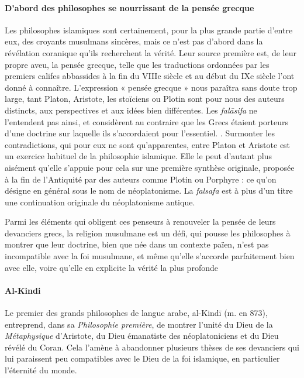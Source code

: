 \paragraph{D'abord des philosophes se nourrissant de la pensée grecque}Les philosophes islamiques sont certainement, pour la plus grande partie
d'entre eux, des croyants musulmans sincères, mais ce n'est pas d'abord
dans la révélation coranique qu'ils recherchent la vérité. Leur source
première est, de leur propre aveu, la pensée grecque, telle que les
traductions ordonnées par les premiers califes abbassides à la fin du
VIIIe siècle et au début du IXe siècle l'ont donné à connaître.
L'expression « pensée grecque » nous paraîtra
sans doute trop large, tant Platon, Aristote, les stoïciens ou Plotin
sont pour nous des auteurs distincts, aux perspectives et aux idées bien
différentes. Les \emph{falāsifa} ne l'entendent pas ainsi, et
considèrent au contraire que les Grecs étaient porteurs d'une doctrine
sur laquelle ils s'accordaient pour l'essentiel. . 
Surmonter les
contradictions, qui pour eux ne sont qu'apparentes, entre Platon et
Aristote est un exercice habituel de la philosophie islamique. Elle le
peut d'autant plus aisément qu'elle s'appuie pour cela sur une première
synthèse originale, proposée à la fin de l'Antiquité par des auteurs
comme Plotin ou Porphyre : ce qu'on désigne en général sous le nom de
néoplatonisme. La \emph{falsafa} est à plus d'un titre une continuation
originale du néoplatonisme antique.

Parmi les éléments qui obligent ces penseurs à renouveler la pensée de
leurs devanciers grecs, la religion musulmane est un défi, qui pousse
les philosophes à montrer que leur doctrine, bien que née dans un
contexte païen, n'est pas incompatible avec la foi musulmane, et même
qu'elle s'accorde parfaitement bien avec elle, voire qu'elle en
explicite la vérité la plus profonde 

\paragraph{Al-Kindi } \label{Theo:AlKindi1}Le premier des grands philosophes
de langue arabe, al-Kindī (m. en 873), entreprend, dans sa
\emph{Philosophie première}, de montrer l'unité du Dieu de la
\emph{Métaphysique} d'Aristote, du Dieu émanatiste des néoplatoniciens
et du Dieu révélé du Coran. Cela l'amène à abandonner plusieurs thèses
de ses devanciers qui lui paraissent peu compatibles avec le Dieu de la
foi islamique, en particulier l'éternité du monde.

